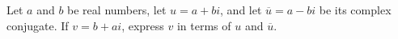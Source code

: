 Let $a$ and $b$ be real numbers, let $u=a+bi$, and let $\overline u=a-bi$ be its complex conjugate. If $v=b+ai$, express $v$ in terms of $u$ and $\overline u$.
